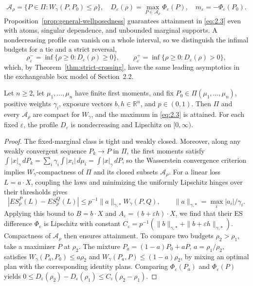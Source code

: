 \begin{equation}
\mathcal A_\rho=\{P\in\Pi:W_\gamma(P,P_0)\le\rho\},\quad
D_\varepsilon(\rho)=\max_{P\in\mathcal A_\rho}\Phi_\varepsilon(P),\quad
m_\varepsilon=-\Phi_\varepsilon(P_0).
\tag{2.3}\label{eq:2.3}
\end{equation}
Proposition~\ref{prop:general-wellposedness} guarantees attainment in \eqref{eq:2.3} even with atoms, singular dependence, and unbounded marginal supports. A nondecreasing profile can vanish on a whole interval, so we distinguish the infimal budgets for a tie and a strict reversal,
\begin{equation}
\rho^-_\varepsilon=\inf\{\rho\ge0:D_\varepsilon(\rho)\ge0\},
\qquad
\rho^+_\varepsilon=\inf\{\rho\ge0:D_\varepsilon(\rho)>0\},
\tag{2.4}\label{eq:2.4}
\end{equation}
which, by Theorem~\ref{thm:strict-crossing}, have the same leading asymptotics in the exchangeable box model of Section~2.2.

\begin{proposition}\label{prop:general-wellposedness}
Let \(n\ge2\), let \(\mu_1,\ldots,\mu_n\) have finite first moments, and fix \(P_0\in\Pi(\mu_1,\ldots,\mu_n)\), positive weights \(\gamma_i\), exposure vectors \(b,h\in\mathbb R^n\), and \(p\in(0,1)\). Then \(\Pi\) and every \(\mathcal A_\rho\) are compact for \(W_\gamma\), and the maximum in \eqref{eq:2.3} is attained. For each fixed \(\varepsilon\), the profile \(D_\varepsilon\) is nondecreasing and Lipschitz on \([0,\infty)\).
\end{proposition}
\begin{proof}
The fixed-marginal class is tight and weakly closed. Moreover, along any weakly convergent sequence \(P_k\to P\) in \(\Pi\), the first moments satisfy \(\int|x|_\gamma\,dP_k=\sum_i\gamma_i\int|x_i|\,d\mu_i=\int|x|_\gamma\,dP\), so the Wasserstein convergence criterion \cite{villani2003} implies \(W_\gamma\)-compactness of \(\Pi\) and its closed subsets \(\mathcal A_\rho\). For a linear loss \(L=a\cdot X\), coupling the laws and minimizing the uniformly Lipschitz hinges over their thresholds gives
\[
|ES_p^P(L)-ES_p^Q(L)|\le p^{-1}\|a\|_{\gamma,*}W_\gamma(P,Q),
\qquad \|a\|_{\gamma,*}=\max_i|a_i|/\gamma_i.
\]
Applying this bound to \(B=b\cdot X\) and \(A_\varepsilon=(b+\varepsilon h)\cdot X\), we find that their ES difference \(\Phi_\varepsilon\) is Lipschitz with constant \(C_\varepsilon=p^{-1}(\|b\|_{\gamma,*}+\|b+\varepsilon h\|_{\gamma,*})\). Compactness of \(\mathcal A_\rho\) then ensures attainment. To compare two budgets \(\rho_2>\rho_1\), take a maximizer \(P\) at \(\rho_2\). The mixture \(P_a=(1-a)P_0+aP\), \(a=\rho_1/\rho_2\), satisfies \(W_\gamma(P_a,P_0)\le a\rho_2\) and \(W_\gamma(P_a,P)\le(1-a)\rho_2\), by mixing an optimal plan with the corresponding identity plans. Comparing \(\Phi_\varepsilon(P_a)\) and \(\Phi_\varepsilon(P)\) yields \(0\le D_\varepsilon(\rho_2)-D_\varepsilon(\rho_1)\le C_\varepsilon(\rho_2-\rho_1)\).
\end{proof}


